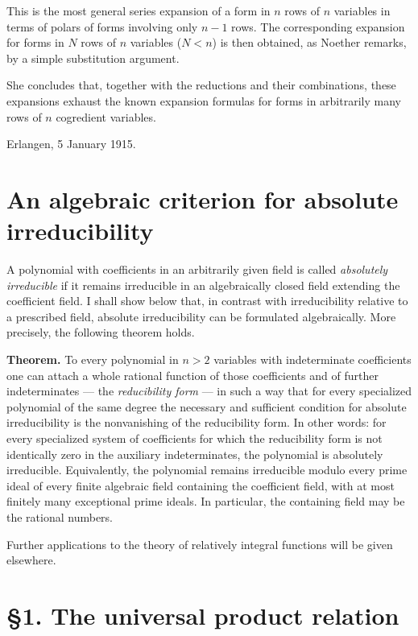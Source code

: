 \documentclass[11pt]{article}
\begin{document}
This is the most general series expansion of a form in \(n\) rows of \(n\) variables in terms of polars of forms involving only \(n-1\) rows. The corresponding expansion for forms in \(N\) rows of \(n\) variables (\(N<n\)) is then obtained, as Noether remarks, by a simple substitution argument.

She concludes that, together with the reductions and their combinations, these expansions exhaust the known expansion formulas for forms in arbitrarily many rows of \(n\) cogredient variables.

\medskip
\noindent
Erlangen, 5 January 1915.

\clearpage
\section*{An algebraic criterion for absolute irreducibility}

A polynomial with coefficients in an arbitrarily given field is called \emph{absolutely irreducible} if it remains irreducible in an algebraically closed field extending the coefficient field. I shall show below that, in contrast with irreducibility relative to a prescribed field, absolute irreducibility can be formulated algebraically. More precisely, the following theorem holds.

\medskip
\noindent\textbf{Theorem.}
To every polynomial in $n>2$ variables with indeterminate coefficients one can attach a whole rational function of those coefficients and of further indeterminates --- the \emph{reducibility form} --- in such a way that for every specialized polynomial of the same degree the necessary and sufficient condition for absolute irreducibility is the nonvanishing of the reducibility form. In other words: for every specialized system of coefficients for which the reducibility form is not identically zero in the auxiliary indeterminates, the polynomial is absolutely irreducible. Equivalently, the polynomial remains irreducible modulo every prime ideal of every finite algebraic field containing the coefficient field, with at most finitely many exceptional prime ideals. In particular, the containing field may be the rational numbers.

Further applications to the theory of relatively integral functions will be given elsewhere.

\section*{\S 1. The universal product relation}
\end{document}
